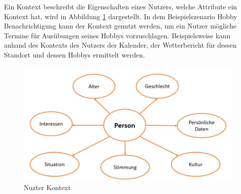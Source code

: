 Ein Kontext beschreibt die Eigenschaften eines Nutzers, welche Attribute ein Kontext hat, wird in Abbildung \ref{fig:kontext} dargestellt. In dem Beispielszenario \glqq Hobby Benachrichtigung \grqq{} kann der Kontext genutzt werden, um ein Nutzer mögliche Termine für Ausübungen seines Hobbys vorzuschlagen. Beispielsweise kann anhand des Kontexts des Nutzers der Kalender, der Wetterbericht für dessen Standort und dessen Hobbys ermittelt werden. 

\begin{figure}[!h]
	\centering
	\includegraphics[width=1\linewidth]{Picture/Kontext}
	\caption[Nuzter Kontext]{Nuzter Kontext}
	\label{fig:kontext}
\end{figure}





